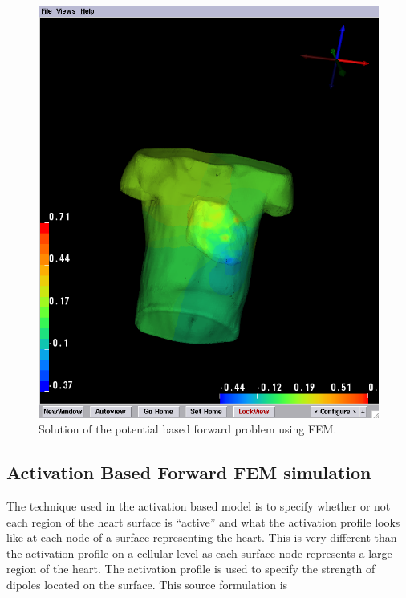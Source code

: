 \begin{figure}[H]
\begin{center}
\includegraphics[width=\textwidth]{ECGToolkitGuide_figures/pot_fem_forward_output.png}
\caption{Solution of the potential based forward problem using FEM.}
\label{fig:pot_fem_for_sol}
\end{center}
\end{figure}
 


\subsection{Activation Based Forward FEM simulation}

The technique used in the activation based model is to specify whether
or not each region of the heart surface is ``active'' and what the
activation profile looks like at each node of a surface representing
the heart. This is very different than the activation profile on a
cellular level as each surface node represents a large region of the
heart. The activation profile is used to specify the strength of
dipoles located on the surface.  This source formulation is 

